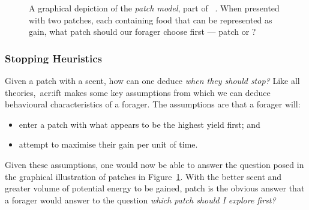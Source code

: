 \begin{figure}[t!]
    \centering
    \caption[The patch model]{A graphical depiction of the \emph{patch model}, part of ~. When presented with two patches, each containing food that can be represented as gain, what patch should our forager choose first — patch  or ?}
    \label{fig:patch_model}
\end{figure}

\subsubsection{Stopping Heuristics}\label{sec:stopping_background:theoretical:ift:stopping}
Given a patch with a scent, how can one deduce \emph{when they should stop?} Like all theories,~\gls{acr:ift} makes some key assumptions from which we can deduce behavioural characteristics of a forager. The assumptions are that a forager will:

\begin{itemize}
    \item{enter a patch with what appears to be the highest yield first; and}
    \item{attempt to maximise their gain per unit of time.}
\end{itemize}

Given these assumptions, one would now be able to answer the question posed in the graphical illustration of patches in Figure~\ref{fig:patch_model}. With the better scent and greater volume of potential energy to be gained, patch  is the obvious answer that a forager would answer to the question \emph{which patch should I explore first?}

